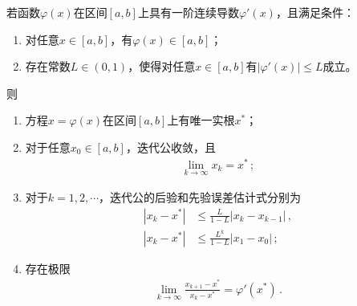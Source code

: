 \begin{theorem}[全局收敛性定理]
    若函数$\varphi(x)$在区间$[a,b]$上具有一阶连续导数$\varphi'(x)$，且满足条件：
    \begin{enumerate}
        \item 对任意$x\in[a,b]$，有$\varphi(x)\in[a,b]$；
        \item 存在常数$L\in(0,1)$，使得对任意$x\in[a,b]$有$|\varphi'(x)|\le L$成立。
    \end{enumerate}
    则
    \begin{enumerate}
        \item 方程$x=\varphi(x)$在区间$[a,b]$上有唯一实根$x^*$；
        \item 对于任意$x_0\in[a,b]$，迭代公收敛，且\begin{align}\label{eq:02ex0308}
                  \lim\limits_{k\rightarrow\infty}{x_k}=x^*\, ;
              \end{align}
        \item 对于$k=1,2,\cdots$，迭代公的后验和先验误差估计式分别为
              \begin{align}
                  |x_k-x^*| & \le\frac{L}{1-L}|x_k-x_{k-1}|\, , \label{eq:02ex0309} \\
                  |x_k-x^*| & \le\frac{L^k}{1-L}|x_1-x_0|\, ;\label{eq:02ex0310}
              \end{align}
        \item 存在极限\begin{align}\label{eq:02ex0311}
                  \lim\limits_{k\rightarrow\infty}{\frac{x_{k+1}-x^*}{x_k-x^*}}=\varphi'(x^*)\, .
              \end{align}
    \end{enumerate}
\end{theorem}
